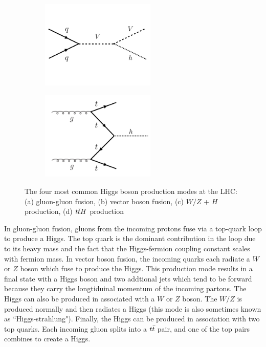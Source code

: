 \begin{figure}[h!]
    \begin{subfigure}[t]{0.5\textwidth}
        \centering
        \includegraphics[width=0.6\textwidth]{figures/V_higgs}
        \caption{}
    \end{subfigure}%
    \begin{subfigure}[t]{0.5\textwidth}
        \centering
        \includegraphics[width=0.6\textwidth]{figures/ttH}
        \caption{}
    \end{subfigure}

   \caption{The four most common Higgs boson production modes at the LHC: (a) gluon-gluon fusion, (b) vector boson fusion, (c) $W/Z$ + $H$ production, (d) $t\bar{t} H$ production}
  \label{fig:production_modes}
\end{figure}

In gluon-gluon fusion, gluons from the incoming protons fuse via a top-quark loop to produce a Higgs. The top quark is the dominant contribution in the loop due to its heavy mass and the fact that the Higgs-fermion coupling constant scales with fermion mass. In vector boson fusion, the incoming quarks each radiate a $W$ or $Z$ boson which fuse to produce the Higgs. This production mode results in a final state with a Higgs boson and two addtional jets which tend to be forward because they carry the longtiduinal momentum of the incoming partons. The Higgs can also be produced in associated with a $W$ or $Z$ boson. The $W/Z$ is produced normally and then radiates a Higgs (this mode is also sometimes known as ``Higgs-strahlung"). Finally, the Higgs can be produced in association with two top quarks. Each incoming gluon splits into a $t\bar{t}$ pair, and one of the top pairs combines to create a Higgs. 

